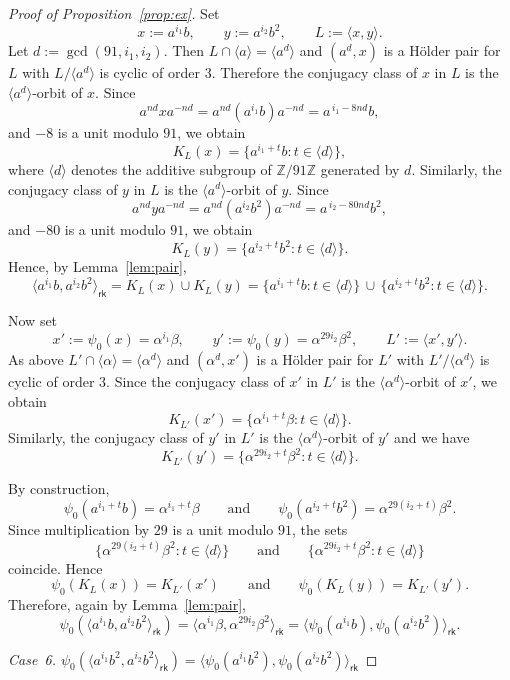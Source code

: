 \documentclass[10pt,a4paper]{amsart}
\begin{document}
\begin{proof}[Proof of Proposition~\ref{prop:ex}]
  \medskip
  Set
  $$ x:=a^{i_1}b,\qquad y:=a^{i_2}b^2,\qquad L:=\langle x,y\rangle. $$
  Let $d:=\gcd(91,i_1,i_2)$. Then $L\cap \langle a\rangle = \langle a^d\rangle$ and $(a^d,x)$ is a Hölder pair for $L$ with $L/\langle a^d\rangle$ is cyclic of order $3$. Therefore the conjugacy class of $x$ in $L$ is the $\langle a^d\rangle$-orbit of $x$. Since
  $$ a^{nd}xa^{-nd}=a^{nd}(a^{i_1}b)a^{-nd}=a^{\,i_1-8nd}b, $$
  and $-8$ is a unit modulo $91$, we obtain
  $$ K_L(x)=\{a^{i_1+t}b : t\in \langle d\rangle\}, $$
  where $\langle d\rangle$ denotes the additive subgroup of $\mathbb{Z}/91\mathbb{Z}$
  generated by $d$. Similarly, the conjugacy class of $y$ in $L$ is the $\langle a^d\rangle$-orbit of $y$. Since
  $$ a^{nd}ya^{-nd}=a^{nd}(a^{i_2}b^2)a^{-nd}=a^{\,i_2-80nd}b^2, $$
  and $-80$ is a unit modulo $91$, we obtain
  $$ K_L(y)=\{a^{i_2+t}b^2 : t\in \langle d\rangle\}. $$
  Hence, by Lemma~\ref{lem:pair},
  $$ \langle a^{i_1}b,a^{i_2}b^2\rangle_{\mathsf{rk}} = K_L(x)\cup K_L(y) = \{a^{i_1+t}b : t\in \langle d\rangle\} \,\cup\, \{a^{i_2+t}b^2 : t\in \langle d\rangle\}. $$
  
  Now set
  $$ x':=\psi_0(x)=\alpha^{i_1}\beta,\qquad y':=\psi_0(y)=\alpha^{29i_2}\beta^2,\qquad L':=\langle x',y'\rangle. $$
  As above $L'\cap \langle \alpha\rangle=\langle \alpha^d\rangle$ and $(\alpha^d,x')$ is a Hölder pair for $L'$ with $L'/\langle\alpha^d \rangle$ is cyclic of order $3$. Since the conjugacy class of $x'$ in $L'$ is the $\langle \alpha^d\rangle$-orbit of $x'$, we obtain
  $$
  K_{L'}(x')=\{\alpha^{i_1+t}\beta : t\in \langle d\rangle\}.
  $$
  Similarly, the conjugacy class of $y'$ in $L'$ is the $\langle \alpha^d\rangle$-orbit of $y'$ and we have
  $$ K_{L'}(y')=\{\alpha^{29i_2+t}\beta^2 : t\in \langle d\rangle\}. $$
  
  By construction,
  $$ \psi_0(a^{i_1+t}b)=\alpha^{i_1+t}\beta \qquad\text{and}\qquad \psi_0(a^{i_2+t}b^2)=\alpha^{29(i_2+t)}\beta^2. $$
  Since multiplication by $29$ is a unit modulo $91$, the sets
  $$ \{\alpha^{29(i_2+t)}\beta^2:t\in \langle d\rangle\} \qquad\text{and}\qquad \{\alpha^{29i_2+t}\beta^2:t\in \langle d\rangle\} $$
  coincide. Hence
  $$ \psi_0(K_L(x))=K_{L'}(x') \qquad\text{and}\qquad \psi_0(K_L(y))=K_{L'}(y'). $$
  Therefore, again by Lemma~\ref{lem:pair},
  $$ \psi_0(\langle a^{i_1}b,a^{i_2}b^2\rangle_{\mathsf{rk}}) = \langle \alpha^{i_1}\beta,\alpha^{29i_2}\beta^2\rangle_{\mathsf{rk}} = \langle \psi_0(a^{i_1}b),\psi_0(a^{i_2}b^2)\rangle_{\mathsf{rk}}. $$
  
  
  
  \medskip
  \noindent
  \emph{Case~6.\; $\psi_0(\langle a^{i_1}b^2,a^{i_2}b^2\rangle_{\mathsf{rk}})
    =\langle \psi_0(a^{i_1}b^2),\psi_0(a^{i_2}b^2)\rangle_{\mathsf{rk}}$}
  

\end{proof}
\end{document}
